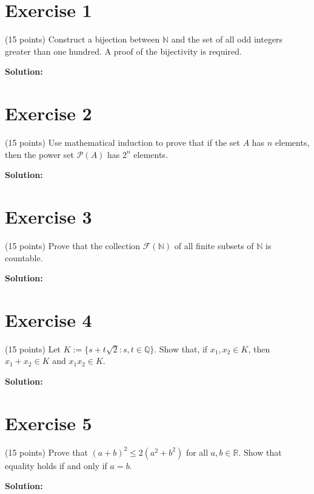 \documentclass{article}
\begin{document}
\section*{Exercise 1}
(15 points) Construct a bijection between $\mathbb{N}$ and the set of all odd integers greater than one hundred. A proof of the bijectivity is required.

\textbf{Solution:}

\newpage

\section*{Exercise 2}
(15 points) Use mathematical induction to prove that if the set $A$ has $n$ elements, then the power set $\mathcal{P}(A)$ has $2^n$ elements.

\textbf{Solution:}

\newpage

\section*{Exercise 3}
(15 points) Prove that the collection $\mathcal{F}(\mathbb{N})$ of all finite subsets of $\mathbb{N}$ is countable.

\textbf{Solution:}

\newpage

\section*{Exercise 4}
(15 points) Let $K := \{s + t\sqrt{2} : s,t \in \mathbb{Q}\}$. Show that, if $x_1, x_2 \in K$, then $x_1 + x_2 \in K$ and $x_1x_2 \in K$.

\textbf{Solution:}

\newpage

\section*{Exercise 5}
(15 points) Prove that $(a + b)^2 \leq 2(a^2 + b^2)$ for all $a,b \in \mathbb{R}$. Show that equality holds if and only if $a = b$.

\textbf{Solution:}
\end{document}
